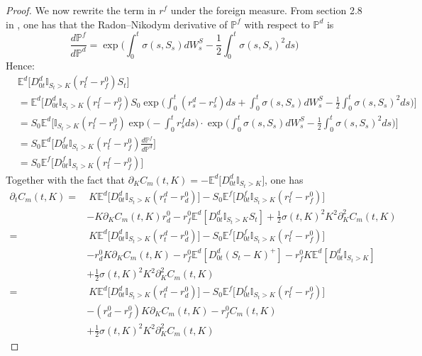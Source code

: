 \begin{proof}
We now rewrite the term in $r^f$ under the foreign measure. From section 2.8 in \cite{clark}, one has that the Radon–Nikodym derivative of $\mathbb{P}^f$ with respect to $\mathbb{P}^d$ is
$$ \frac{d\mathbb{P}^f}{d\mathbb{P}^d}=\exp\bigg( \int_0^t\sigma(s,S_s) dW^S_s - \frac{1}{2}\int_0^t\sigma(s,S_s)^2 ds\bigg)$$
Hence:
\begin{align*}
& \mathbb{E}^d\big[ D^d_{0t}\mathbb{I}_{S_t>K}(r_t^f - r_f^0 )S_t \big] \\
& = \mathbb{E}^d\bigg[ D^d_{0t}\mathbb{I}_{S_t>K}(r_t^f - r_f^0 )S_0\exp\bigg( \int_0^t (r_s^d - r_s^f)ds + \int_0^t\sigma(s,S_s) dW^S_s - \frac{1}{2}\int_0^t\sigma(s,S_s)^2 ds \bigg) \bigg] \\
& =  S_0\mathbb{E}^d\bigg[\mathbb{I}_{S_t>K}(r_t^f - r_f^0 )\exp\bigg( -\int_0^t r_s^fds\bigg)\cdot\exp\bigg( \int_0^t\sigma(s,S_s) dW^S_s - \frac{1}{2}\int_0^t\sigma(s,S_s)^2 ds \bigg)  \bigg] \\
& =  S_0\mathbb{E}^d\bigg[D^f_{0t}\mathbb{I}_{S_t>K}(r_t^f - r_f^0 )\frac{d\mathbb{P}^f}{d\mathbb{P}^d}\bigg]\\
& =  S_0\mathbb{E}^f\big[D^f_{0t}\mathbb{I}_{S_t>K}(r_t^f - r_f^0 )\big]
\end{align*}
Together with the fact that $\partial_K C_m(t,K)= -\mathbb{E}^d\big[ D^d_{0t}\mathbb{I}_{S_t>K} \big] $, one has
\begin{align*}
\partial_tC_m(t,K) = & \ K\mathbb{E}^d\big[ D^d_{0t}\mathbb{I}_{S_t>K}(r_t^d - r_d^0 )\big] -  S_0\mathbb{E}^f\big[D^f_{0t}\mathbb{I}_{S_t>K}(r_t^f - r_f^0 )\big]\\
&- K \partial_K C_m(t,K)r_d^0 - r_f^0\mathbb{E}^d[D^d_{0t}\mathbb{I}_{S_t>K} S_t]+ \frac{1}{2}\sigma(t,K)^2K^2\partial_K^2C_m(t,K)\\
= & \ K\mathbb{E}^d\big[ D^d_{0t}\mathbb{I}_{S_t>K}(r_t^d - r_d^0 )\big] -  S_0\mathbb{E}^f\big[D^f_{0t}\mathbb{I}_{S_t>K}(r_t^f - r_f^0 )\big]\\
& - r_d^0 K \partial_K C_m(t,K) - r_f^0\mathbb{E}^d[D^d_{0t}(S_t-K)^+]- r_f ^0K\mathbb{E}^d[D^d_{0t}\mathbb{I}_{S_t>K}]\\
& + \frac{1}{2}\sigma(t,K)^2K^2\partial_K^2C_m(t,K)\\
= & \ K\mathbb{E}^d\big[ D^d_{0t}\mathbb{I}_{S_t>K}(r_t^d - r_d^0 )\big] -  S_0\mathbb{E}^f\big[D^f_{0t}\mathbb{I}_{S_t>K}(r_t^f - r_f^0 )\big]\\
& - (r_d^0 - r_f^0) K \partial_K C_m(t,K) - r_f^0 C_m(t,K)  \\
& + \frac{1}{2}\sigma(t,K)^2K^2\partial_K^2C_m(t,K)
\end{align*}

\end{proof}
